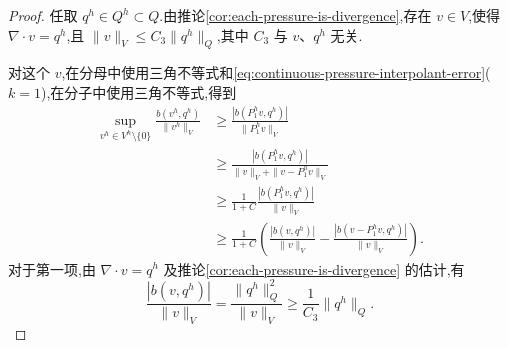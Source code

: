 \begin{proof}
任取 $q^h\in Q^h\subset Q$.由推论\ref{cor:each-pressure-is-divergence},存在 $v\in V$,使得 $\nabla\cdot v=q^h$,且 $\|v\|_V\le C_3\|q^h\|_Q$,其中 $C_3$ 与 $v$、$q^h$ 无关.

对这个 $v$,在分母中使用三角不等式和\cref{eq:continuous-pressure-interpolant-error}($k=1$),在分子中使用三角不等式,得到
\begin{equation}\label{eq:continuous-pressure-interpolant-sup-estimate}
\begin{aligned}
  \sup_{v^h\in V^h\setminus\{0\}}
    \frac{b(v^h,q^h)}{\|v^h\|_V}
  &\ge
    \frac{|b(P_1^h v,q^h)|}{\|P_1^h v\|_V}\\
  &\ge
    \frac{|b(P_1^h v,q^h)|}
         {\|v\|_V+\|v-P_1^h v\|_V}\\
  &\ge \frac{1}{1+C}
       \frac{|b(P_1^h v,q^h)|}{\|v\|_V}\\
  &\ge \frac{1}{1+C}
       \left(
         \frac{|b(v,q^h)|}{\|v\|_V}
         -\frac{|b(v-P_1^h v,q^h)|}{\|v\|_V}
       \right).
\end{aligned}
\end{equation}
对于第一项,由 $\nabla\cdot v=q^h$ 及推论\ref{cor:each-pressure-is-divergence} 的估计,有
\[
  \frac{|b(v,q^h)|}{\|v\|_V}
  =\frac{\|q^h\|_Q^2}{\|v\|_V}
  \ge\frac{1}{C_3}\|q^h\|_Q.
\]


\end{proof}
